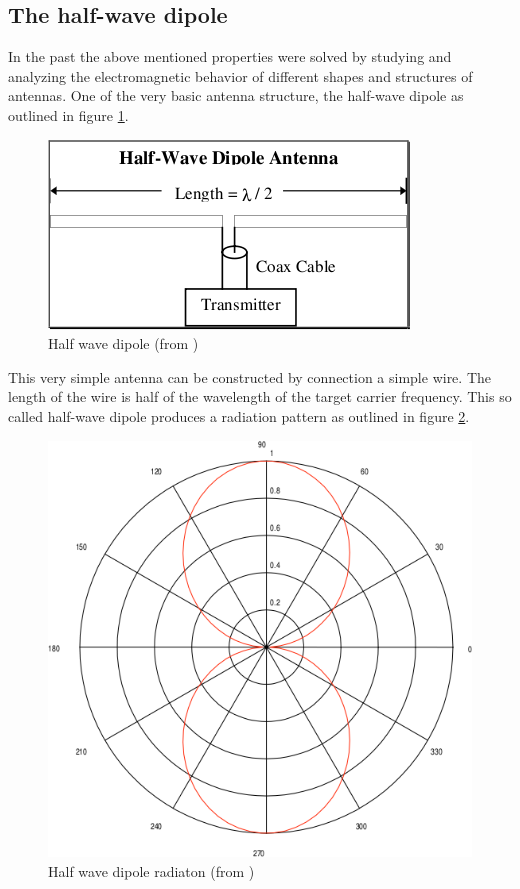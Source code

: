 \subsection{The half-wave dipole}
In the past the above mentioned properties were solved by studying and analyzing the electromagnetic behavior of different shapes and structures of antennas. One of the very basic antenna structure, the half-wave dipole as outlined in figure \ref{fig:halfwave}.

\begin{figure}[!h]
\centering
\includegraphics[scale=0.6]{figures/halfwave_antanna.png}\caption{\label{fig:halfwave}Half wave dipole (from \cite{primer})}
\end{figure}

This very simple antenna can be constructed by connection a simple wire. The length of the wire is half of the wavelength of the target carrier frequency. This so called half-wave dipole produces a radiation pattern as outlined in figure \ref{fig:halfwave_radiation}.

\begin{figure}[!h]
\centering
\includegraphics[scale=0.6]{figures/halfwave_radiation.png}\caption{\label{fig:halfwave_radiation}Half wave dipole radiaton (from \cite{primer})}
\end{figure}

